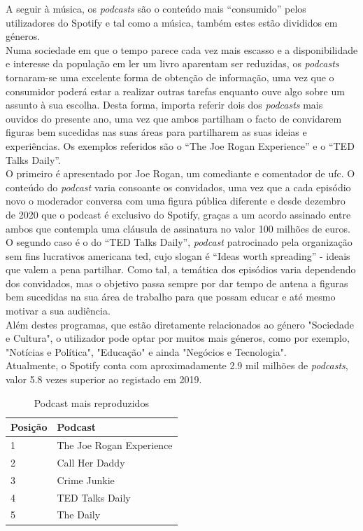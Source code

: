 A seguir à música, os \textit{podcasts} são o conteúdo mais “consumido” pelos utilizadores do Spotify e tal como a música, também estes estão divididos em géneros.\\
Numa sociedade em que o tempo parece cada vez mais escasso e a disponibilidade e interesse da população em ler um livro aparentam ser reduzidas, os \textit{podcasts} tornaram-se uma excelente forma de obtenção de informação, uma vez que o consumidor poderá estar a realizar outras tarefas enquanto ouve algo sobre um assunto à sua escolha. Desta forma, importa referir dois dos \textit{podcasts} mais ouvidos do presente ano, uma vez que ambos partilham o facto de convidarem figuras bem sucedidas nas suas áreas para partilharem as suas ideias e experiências. Os exemplos referidos são o “The Joe Rogan Experience” e o “TED Talks Daily”.\\
O primeiro é apresentado por Joe Rogan, um comediante e comentador de \ac{ufc}. O conteúdo do \textit{podcast} varia consoante os convidados, uma vez que a cada episódio novo o moderador conversa com uma figura pública diferente e desde dezembro de 2020 que o podcast é exclusivo do Spotify, graças a um acordo assinado entre ambos que contempla uma cláusula de assinatura no valor 100 milhões de euros.\\
O segundo caso é o do “TED Talks Daily”, \textit{podcast} patrocinado pela organização sem fins lucrativos americana \ac{ted}, cujo slogan é “Ideas worth spreading” - ideais que valem a pena partilhar. Como tal, a temática dos episódios varia dependendo dos convidados, mas o objetivo passa sempre por dar tempo de antena a figuras bem sucedidas na sua área de trabalho para que possam educar e até mesmo motivar a sua audiência.\\
Além destes programas, que estão diretamente relacionados ao género "Sociedade e Cultura", o utilizador pode optar por muitos mais géneros, como por exemplo, "Notícias e Política", "Educação" e ainda "Negócios e Tecnologia".\\
Atualmente, o Spotify conta com aproximadamente 2.9 mil milhões de \textit{podcasts}, valor 5.8 vezes superior ao registado em 2019.

\begin{table}[H]
	\centering
	\caption{Podcast mais reproduzidos}
	\begin{tabular}{l|l}
	Posição & Podcast \\
	\hline
	1       &     The Joe Rogan Experience     \\
	2       &    Call Her Daddy \\
	3       &     Crime Junkie \\
	4       &        TED Talks Daily  \\
	5       &   The Daily
\end{tabular}
\end{table}
